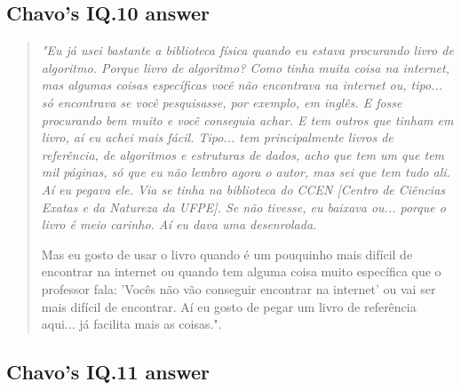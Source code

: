 \subsection{Chavo’s IQ.10 answer}
\label{interview-exc-ss:chavo-iq10}

\begin{quote}
    \itshape
    "Eu já usei bastante a biblioteca física quando eu estava procurando livro de algoritmo. Porque livro de algoritmo? Como tinha muita coisa na internet, mas algumas coisas específicas você não encontrava na internet ou, tipo... só encontrava se você pesquisasse, por exemplo, em inglês. E fosse procurando bem muito e você conseguia achar. E tem outros que tinham em livro, aí eu achei mais fácil. Tipo... tem principalmente livros de referência, de algoritmos e estruturas de dados, acho que tem um que tem mil páginas, só que eu não lembro agora o autor, mas sei que tem tudo ali. Aí eu pegava ele. Via se tinha na biblioteca do CCEN [Centro de Ciências Exatas e da Natureza da \gls{UFPE}]. Se não tivesse, eu baixava ou... porque o livro é meio carinho. Aí eu dava uma desenrolada. 
    
    Mas eu gosto de usar o livro quando é um pouquinho mais difícil de encontrar na internet ou quando tem alguma coisa muito específica que o professor fala: 'Vocês não vão conseguir encontrar na internet' ou vai ser mais difícil de encontrar. Aí eu gosto de pegar um livro de referência aqui... já facilita mais as coisas.".    
\end{quote}
\subsection{Chavo’s IQ.11 answer}
\label{interview-exc-ss:chavo-iq11}

